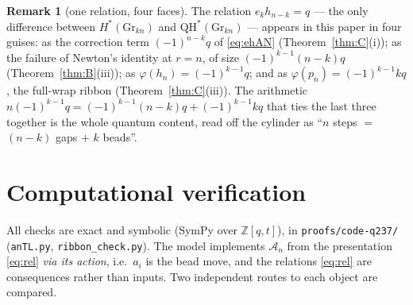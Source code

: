\documentclass[11pt]{article}
\theoremstyle{plain}
\theoremstyle{definition}
\newtheorem{remark}[theorem]{Remark}
\newcommand{\A}{\mathscr{A}}
\newcommand{\QH}{\mathrm{QH}^*}
\newcommand{\Gr}{\mathrm{Gr}}
\newcommand{\ZZ}{\mathbb{Z}}
\begin{document}
\begin{remark}[one relation, four faces]
The relation $e_kh_{n-k}=q$ --- the only difference between $H^*(\Gr_{kn})$
and $\QH(\Gr_{kn})$ --- appears in this paper in four guises:
as the correction term $(-1)^{n-k}q$ of \eqref{eq:ehAN}
(Theorem~\ref{thm:C}(i));
as the failure of Newton's identity at $r=n$, of size $(-1)^{k-1}(n-k)q$
(Theorem~\ref{thm:B}(iii));
as $\varphi(h_n)=(-1)^{k-1}q$;
and as $\varphi(p_n)=(-1)^{k-1}kq$, the full-wrap ribbon
(Theorem~\ref{thm:C}(iii)).  The arithmetic
$n(-1)^{k-1}q=(-1)^{k-1}(n-k)q+(-1)^{k-1}kq$ that ties the last three
together is the whole quantum content, read off the cylinder as
``$n$ steps $=$ $(n-k)$ gaps $+$ $k$ beads''.
\end{remark}

\section{Computational verification}\label{sec:verif}

All checks are exact and symbolic (SymPy over $\ZZ[q,t]$), in
\texttt{proofs/code-q237/} (\texttt{anTL.py}, \texttt{ribbon\_check.py}).
The model implements $\A_n$ from the presentation
\eqref{eq:rel} \emph{via its action}, i.e.\ $a_i$ is the bead move, and
the relations \eqref{eq:rel} are consequences rather than inputs.  Two
independent routes to each object are compared.
\end{document}
